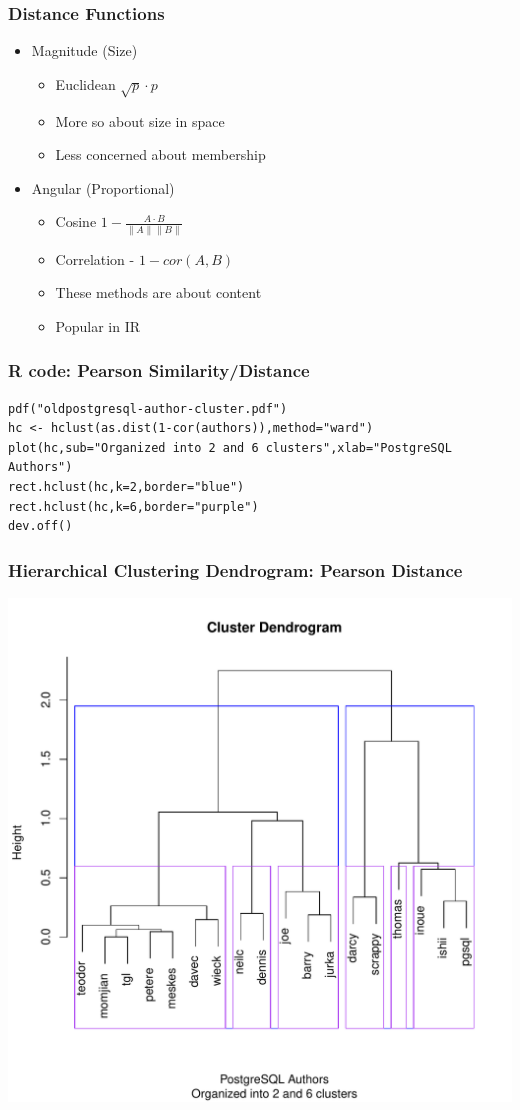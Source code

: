 \documentclass[bigger]{beamer}
\begin{document}
\begin{frame}
\frametitle{Distance Functions}
\label{sec-1-7}


\begin{itemize}
\item Magnitude (Size)
\begin{itemize}
\item Euclidean  $\sqrt p \cdot p$
\item More so about size in space
\item Less concerned about membership
\end{itemize}
\item Angular (Proportional)
\begin{itemize}
\item Cosine $1 - \frac{A \cdot B}{\|A\|\|B\|}$
\item Correlation - $1 - cor(A,B)$
\item These methods are about content
\item Popular in IR
\end{itemize}
\end{itemize}
\end{frame}
\begin{frame}[fragile]
\frametitle{R code: Pearson Similarity/Distance}
\label{sec-1-8}


\begin{verbatim}
pdf("oldpostgresql-author-cluster.pdf")
hc <- hclust(as.dist(1-cor(authors)),method="ward")
plot(hc,sub="Organized into 2 and 6 clusters",xlab="PostgreSQL Authors")
rect.hclust(hc,k=2,border="blue")
rect.hclust(hc,k=6,border="purple")
dev.off()
\end{verbatim}
\end{frame}
\begin{frame}
\frametitle{Hierarchical Clustering Dendrogram: Pearson Distance}
\label{sec-1-9}

   \includegraphics[height=0.8\textheight]{./oldpostgresql-author-cluster.pdf}        
\end{frame}
\end{document}
